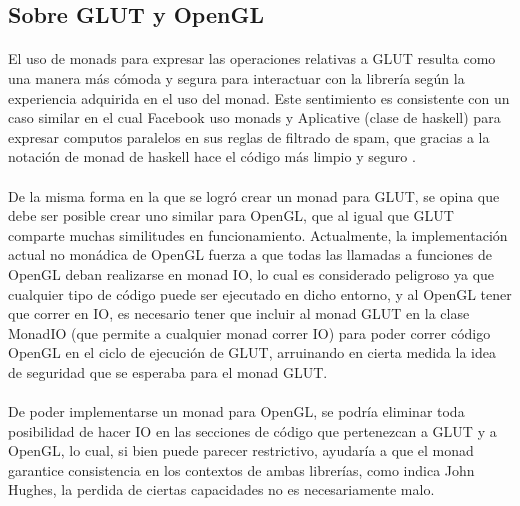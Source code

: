 \documentclass{standalone}
\begin{document}
\subsection{Sobre GLUT y OpenGL}

\paragraph{}
El uso de monads para expresar las operaciones relativas a GLUT resulta como una manera más cómoda y segura para interactuar con la librería según la experiencia adquirida en el uso del monad. Este sentimiento es consistente con un caso similar en el cual Facebook uso monads y Aplicative (clase de haskell) para expresar computos paralelos en sus reglas de filtrado de spam, que gracias a la notación de monad de haskell hace el código más limpio y seguro \cite{marlow2014there} \cite{Facebook:Fighting} \cite{Facebook:sourcing}.

\paragraph{}
De la misma forma en la que se logró crear un monad para GLUT, se opina que debe ser posible crear uno similar para OpenGL, que al igual que GLUT comparte muchas similitudes en funcionamiento. Actualmente, la implementación actual no monádica de OpenGL fuerza a que todas las llamadas a funciones de OpenGL deban realizarse en monad IO, lo cual es considerado peligroso ya que cualquier tipo de código puede ser ejecutado en dicho entorno, y al OpenGL tener que correr en IO, es necesario tener que incluir al monad GLUT en la clase MonadIO (que permite a cualquier monad correr IO) para poder correr código OpenGL en el ciclo de ejecución de GLUT, arruinando en cierta medida la idea de seguridad que se esperaba para el monad GLUT.

\paragraph{}
De poder implementarse un monad para OpenGL, se podría eliminar toda posibilidad de hacer IO en las secciones de código que pertenezcan a GLUT y a OpenGL, lo cual, si bien puede parecer restrictivo, ayudaría a que el monad garantice consistencia en los contextos de ambas librerías, como indica John Hughes, la perdida de ciertas capacidades no es necesariamente malo.
\end{document}
